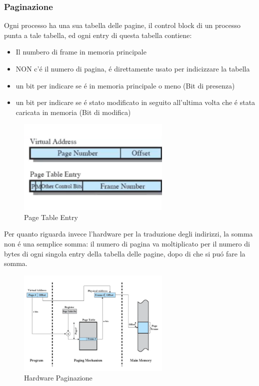     \subsubsection*{Paginazione}
    Ogni processo ha una sua tabella delle pagine, il control block di un processo punta a tale tabella, ed ogni entry
    di questa tabella contiene:
    \begin{itemize}
        \item Il numbero di frame in memoria principale
        \item NON c'é il numero di pagina, é direttamente usato per indicizzare la tabella
        \item un bit per indicare se é in memoria principale o meno (Bit di presenza)
        \item un bit per indicare se é stato modificato in seguito all'ultima volta che é stata caricata in memoria (Bit di modifica)
    \end{itemize}
    \begin{figure}
        \centering
        \includegraphics[width=0.65\textwidth]{immagini/pagetableentry}
        \caption{Page Table Entry}
        \label{fig:pagetableentry}
    \end{figure}
    Per quanto riguarda invece l'hardware per la traduzione degli indirizzi, la somma non é una semplice somma: il numero
    di pagina va moltiplicato per il numero di bytes di ogni singola entry della tabella delle pagine, dopo di che si puó
    fare la somma.
    \begin{figure}[H]
        \centering
        \includegraphics[width=0.65\textwidth]{immagini/HardwarePerPaginazione}
        \caption{Hardware Paginazione}
        \label{fig:hardwarepaginazione}
    \end{figure}
